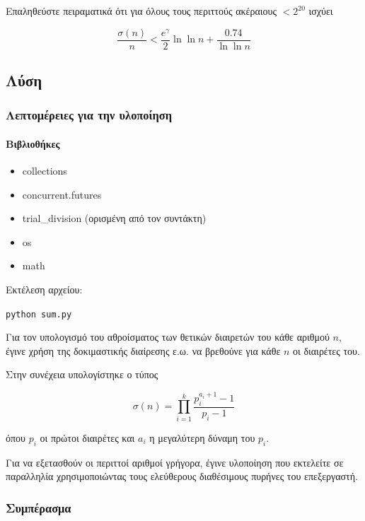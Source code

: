 \documentclass[oneside]{article}
\let\t\texttt
\begin{document}
Επαληθεύστε πειραματικά ότι για όλους τους περιττούς ακέραιους $< 2^{20}$ ισχύει

\begin{equation}\label{eq:611}
    \frac{\sigma(n)}{n} < \frac{e^{\gamma}}{2}\ln{\ln{n}} + \frac{0.74}{\ln{\ln{n}}}
\end{equation}

\subsection{Λύση} 

\subsubsection{Λεπτομέρειες για την υλοποίηση}

\paragraph{Βιβλιοθήκες}

\begin{itemize}
    \item collections
    \item concurrent.futures
    \item trial\_division (ορισμένη από τον συντάκτη)
    \item os
    \item math
\end{itemize}

Εκτέλεση αρχείου:

\begin{center}
    \t{python sum.py}
\end{center}

Για τον υπολογισμό του αθροίσματος των θετικών διαιρετών του κάθε αριθμού $n$, έγινε χρήση της δοκιμαστικής διαίρεσης ε.ω. να βρεθούνε για κάθε $n$ οι διαιρέτες του. 

Στην συνέχεια υπολογίστηκε ο τύπος 

\[
    \sigma(n) = \prod_{i=1}^k \frac{p_i^{a_i+1} - 1}{p_i - 1}
\]

όπου $p_i$ οι πρώτοι διαιρέτες και $a_i$ η μεγαλύτερη δύναμη του $p_i$.

Για να εξετασθούν οι περιττοί αριθμοί γρήγορα, έγινε υλοποίηση που εκτελείτε σε παραλληλία χρησιμοποιώντας τους ελεύθερους διαθέσιμους πυρήνες του επεξεργαστή.

\subsubsection{Συμπέρασμα}
\end{document}

